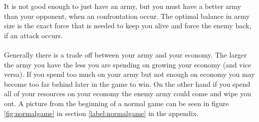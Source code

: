 	It is not good enough to just have an army, but you must have a better army than your opponent, when an confrontation occur.
	The optimal balance in army size is the exact force that is needed to keep you alive and force the enemy back, if an attack occurs.
\\
\\	
	Generally there is a trade off between your army and your economy. 
	The larger the army you have the less you are spending on growing your economy (and vice versa). 
	If you spend too much on your army but not enough on economy you may become too far behind later in the game to win. 
	On the other hand if you spend all of your resources on your economy the enemy army could come and wipe you out. A picture from the beginning of a normal game can be seen in figure \ref{fig:normalgame} in section \ref{label:normalgame} in the appendix.\\

 